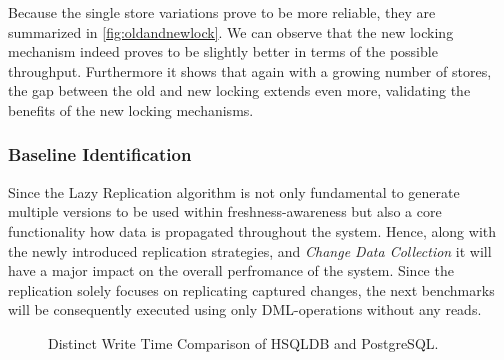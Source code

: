 Because the single store variations prove to be more reliable, they are summarized in \ref{fig:oldandnewlock}.
We can observe that the new locking mechanism indeed proves to be slightly better in terms of the possible throughput.
Furthermore it shows that again with a growing number of stores, the gap between the old and new locking extends even more, validating the benefits of the new locking mechanisms.






\subsubsection{Baseline Identification} 


Since the Lazy Replication algorithm is not only fundamental to generate multiple versions to be used within freshness-awareness
but also a core functionality how data is propagated throughout the system. 
Hence, along with the newly introduced replication strategies, and \emph{Change Data Collection} it will have a major impact on the overall perfromance of the system.
Since the replication solely focuses on replicating captured changes, the next benchmarks will be consequently executed using only DML-operations without any reads.\\

\begin{figure}[t] 
    \centering 
    \caption{Distinct Write Time Comparison of HSQLDB and PostgreSQL.}
    \label{fig:singlepsqlhsql}
\end{figure}

